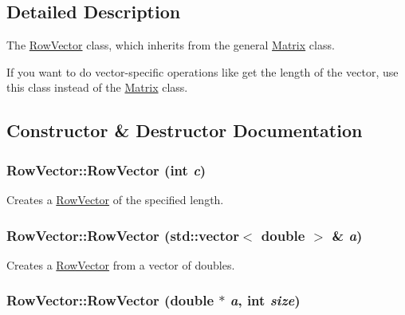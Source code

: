 \subsection{Detailed Description}
The \hyperlink{class_row_vector}{RowVector} class, which inherits from the general \hyperlink{class_matrix}{Matrix} class. 

If you want to do vector-specific operations like get the length of the vector, use this class instead of the \hyperlink{class_matrix}{Matrix} class. 

\subsection{Constructor \& Destructor Documentation}
\hypertarget{class_row_vector_2f27ef01198c0c996290f5d6d1680297}{
\subsubsection[{RowVector}]{\setlength{\rightskip}{0pt plus 5cm}RowVector::RowVector (int {\em c})}}
\label{class_row_vector_2f27ef01198c0c996290f5d6d1680297}


Creates a \hyperlink{class_row_vector}{RowVector} of the specified length. 

\hypertarget{class_row_vector_6f0b27522b67138a7313c4a75750a7a6}{
\subsubsection[{RowVector}]{\setlength{\rightskip}{0pt plus 5cm}RowVector::RowVector (std::vector$<$ double $>$ \& {\em a})}}
\label{class_row_vector_6f0b27522b67138a7313c4a75750a7a6}


Creates a \hyperlink{class_row_vector}{RowVector} from a vector of doubles. 

\hypertarget{class_row_vector_fdb9cc1d09c9dfaef6af93aec542f498}{
\subsubsection[{RowVector}]{\setlength{\rightskip}{0pt plus 5cm}RowVector::RowVector (double $\ast$ {\em a}, \/  int {\em size})}}
\label{class_row_vector_fdb9cc1d09c9dfaef6af93aec542f498}


